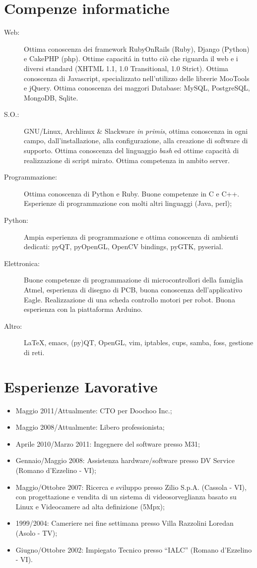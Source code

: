 \documentclass[pdftex, a4paper, 11pt]{article}
\begin{document}
\section*{Compenze informatiche}
\begin{description}
\item[Web:] Ottima conoscenza dei framework RubyOnRails (Ruby), Django
  (Python) e CakePHP (php). Ottime capacit\'a in
  tutto ci\`o che riguarda il web e i diversi standard (XHTML 1.1,
  1.0 Transitional, 1.0 Strict). Ottima conoscenza
  di Javascript, specializzato nell'utilizzo delle librerie MooTools e jQuery.
  Ottima conoscenza dei maggori Database: MySQL, PostgreSQL, MongoDB, Sqlite.
\item[S.O.:] GNU/Linux, Archlinux \& Slackware {\em in primis},
  ottima conoscenza
  in ogni campo, dall'installazione, alla configurazione, alla
  creazione di software di supporto. Ottima conoscenza del linguaggio
  {\em bash} ed ottime capacit\`a di realizzazione di script
  mirato. Ottima competenza in ambito server.
\item[Programmazione:] Ottima conoscenza di Python e Ruby. Buone competenze in C e C++. 
  Esperienze di programmazione con molti altri linguaggi (Java, perl);
\item[Python:] Ampia esperienza di programmazione e ottima conoscenza
  di ambienti dedicati: pyQT, pyOpenGL, OpenCV bindings, pyGTK,
  pyserial.
\item[Elettronica:] Buone competenze di programmazione di
  microcontrollori della famiglia Atmel, esperienza di disegno di PCB,
  buona conoscenza dell'applicativo Eagle. Realizzazione di una scheda
  controllo motori per robot. Buona esperienza con la piattaforma Arduino.
\item[Altro:] \LaTeX, emacs, (py)QT, OpenGL, vim, iptables, cups,
  samba, foss, gestione di reti.
\end{description}

\section*{Esperienze Lavorative}
\begin{itemize}
\item Maggio 2011/Attualmente: CTO per Doochoo Inc.;
\item Maggio 2008/Attualmente: Libero professionista;
\item Aprile 2010/Marzo 2011: Ingegnere del software presso M31;
\item Gennaio/Maggio 2008: Assistenza hardware/software presso DV
  Service (Romano d'Ezzelino - VI);
\item Maggio/Ottobre 2007: Ricerca e sviluppo presso Zilio
  S.p.A. (Cassola - VI), con progettazione e vendita di un sistema di
  videosorveglianza basato su Linux e Videocamere ad alta definizione
  (5Mpx);
\item 1999/2004: Cameriere nei fine settimana presso Villa Razzolini
  Loredan (Asolo - TV);
\item Giugno/Ottobre 2002: Impiegato Tecnico presso ``IALC'' (Romano
  d'Ezzelino - VI).
\end{itemize}
\end{document}
